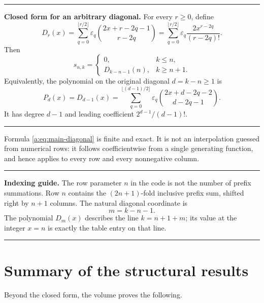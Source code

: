 \documentclass[11pt,a4paper,oneside,openany]{book}
\numberwithin{equation}{chapter}
\theoremstyle{definition}
\theoremstyle{remark}
\newcommand{\eps}{\varepsilon}
\newcommand{\rising}[2]{#1^{\overline{#2}}}
\newcommand{\Diag}{D}
\newenvironment{boxedsummary}{%
  \par\medskip\noindent\begin{center}\begin{minipage}{0.94\textwidth}%
  \hrule\vspace{0.7em}\small
}{%
  \vspace{0.7em}\hrule\end{minipage}\end{center}\medskip
}
\newenvironment{resultbox}{%
  \par\smallskip\noindent\begin{center}\begin{minipage}{0.94\textwidth}%
  \color{black}\hrule\vspace{0.65em}\small
}{%
  \vspace{0.65em}\hrule\end{minipage}\end{center}\smallskip
}
\begin{document}
\begin{boxedsummary}
\textbf{Closed form for an arbitrary diagonal.}
For every \(r\ge0\), define
\begin{equation}
 \boxed{
 \Diag_r(x)=
 \sum_{q=0}^{\lfloor r/2\rfloor}
 \eps_q\binom{2x+r-2q-1}{r-2q}
 =\sum_{q=0}^{\lfloor r/2\rfloor}
 \eps_q\frac{\rising{2x}{r-2q}}{(r-2q)!}.}
 \label{a:eq:main-diagonal}
\end{equation}
Then
\begin{equation}
 \boxed{
 s_{n,k}=\begin{cases}
 0,&k\le n,\\[2mm]
 \Diag_{k-n-1}(n),&k\ge n+1.
 \end{cases}}
 \label{a:eq:main-table-answer}
\end{equation}
Equivalently, the polynomial on the original diagonal \(d=k-n\ge1\) is
\begin{equation}
 \boxed{
 P_d(x)=\Diag_{d-1}(x)=
 \sum_{q=0}^{\lfloor(d-1)/2\rfloor}
 \eps_q\binom{2x+d-2q-2}{d-2q-1}.}
 \label{a:eq:main-d-answer}
\end{equation}
It has degree \(d-1\) and leading coefficient \(2^{d-1}/(d-1)!\).
\end{boxedsummary}

Formula \eqref{a:eq:main-diagonal} is finite and exact.  It is not an
interpolation guessed from numerical rows: it follows coefficientwise from a
single generating function, and hence applies to every row and every
nonnegative column.
\begin{resultbox}
\textbf{Indexing guide.}
The row parameter $n$ in the code is not the number of prefix summations.
Row $n$ contains the $(2n+1)$-fold inclusive prefix sum, shifted right by
$n+1$ columns.  The natural diagonal coordinate is
\[
 m=k-n-1.
\]
The polynomial $\Diag_m(x)$ describes the line $k=n+1+m$; its value at the
integer $x=n$ is exactly the table entry on that line.
\end{resultbox}

\section{Summary of the structural results}

Beyond the closed form, the volume proves the following.
\end{document}
